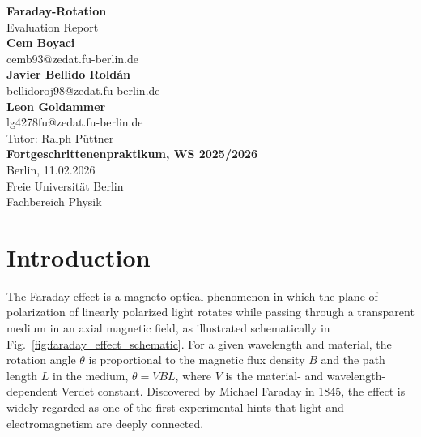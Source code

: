 \documentclass[a4paper]{article}
\begin{document}
\begin{titlepage}
  \thispagestyle{empty}
  \begin{center}

    \vspace*{1cm}
    {\LARGE \textbf{Faraday-Rotation}}\\[1.2cm]

    {\large Evaluation Report}\\[2cm]

    \large
    \textbf{Cem Boyaci}\\[-1mm]
    {cemb93@zedat.fu-berlin.de}\\[1cm]

    \textbf{Javier Bellido Roldán}\\[-1mm]
    {bellidoroj98@zedat.fu-berlin.de}\\[1cm]

    \textbf{Leon Goldammer}\\[-1mm]
    {lg4278fu@zedat.fu-berlin.de}\\[6cm]

    \normalsize
    {Tutor: Ralph Püttner}\\[1.2cm]

    \textbf{Fortgeschrittenenpraktikum, WS 2025/2026}\\
    Berlin, 11.02.2026\\
    Freie Universität Berlin\\
    Fachbereich Physik

  \end{center}
\end{titlepage}

\clearpage
\renewcommand*\contentsname{\huge Contents}
{
  \tableofcontents
  \clearpage
}

\newpage
\setcounter{page}{1}

\section{Introduction}

The Faraday effect is a magneto-optical phenomenon in which the plane of polarization of linearly polarized light rotates while passing through a transparent medium in an axial magnetic field, as illustrated schematically in Fig.~\ref{fig:faraday_effect_schematic}.
For a given wavelength and material, the rotation angle $\theta$ is proportional to the magnetic flux density $B$ and the path length $L$ in the medium, \mbox{$\theta = VBL$}, where $V$ is the material- and wavelength-dependent Verdet constant.
Discovered by Michael Faraday in 1845, the effect is widely regarded as one of the first experimental hints that light and electromagnetism are deeply connected.
\end{document}
